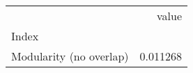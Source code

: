 \begin{tabular}{lr}
\toprule
{} &     value \\
Index                   &           \\
\midrule
Modularity (no overlap) &  0.011268 \\
\bottomrule
\end{tabular}
